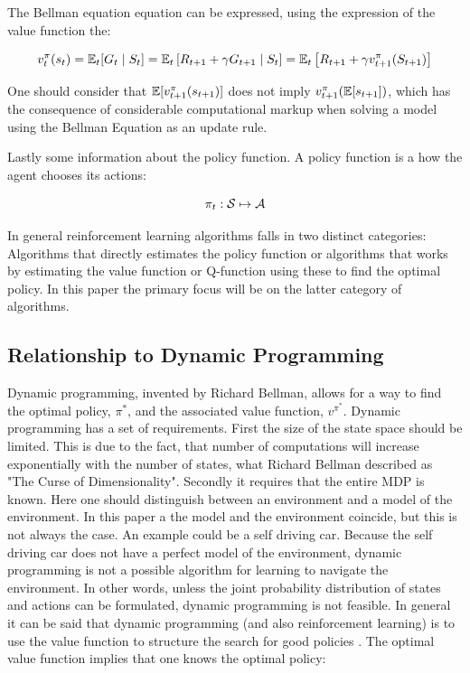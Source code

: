 The Bellman equation equation can be expressed, using the expression of the value function the:

\begin{equation}
    v^{\pi}_{t} (s_t) = \mathbb{E}_t [G_t \mid S_t] = \mathbb{E}_t  \left[ R_{t+1} + \gamma G_{t+1} \mid S_t \right] = \mathbb{E}_t \left[ R_{t+1} + \gamma v_{t+1}^{\pi}(S_{t+1}) \right]
\end{equation}

One should consider that $\mathbb{E} [v_{t+1}^\pi(s_{t+1})]$ does not imply $v_{t+1}^{\pi}(\mathbb{E}[s_{t+1}])$, which has the consequence of considerable computational markup when solving a model using the Bellman Equation as an update rule.

Lastly some information about the policy function.  A policy function is a how the agent chooses its actions:

\begin{equation}
    \pi_t : \mathcal{S} \mapsto \mathcal{A} 
\end{equation}

In general reinforcement learning algorithms falls in two distinct categories: Algorithms that directly estimates the policy function or algorithms that works by estimating the value function or Q-function using these to find the optimal policy. In this paper the primary focus will be on the latter category of algorithms.

\subsection{Relationship to Dynamic Programming}\label{sec:dynamic_programming}

Dynamic programming, invented by Richard Bellman, allows for a way to find the optimal policy, $\pi^{*}$, and the associated value function, $v^{\pi^{*}}$. Dynamic programming has a set of requirements. First the size of the state space should be limited. This is due to the fact, that number of computations will increase exponentially with the number of states, what Richard Bellman described as "The Curse of Dimensionality". Secondly it requires that the entire MDP is known. Here one should distinguish between an environment and a model of the environment. In this paper a the model and the environment coincide, but this is not always the case. An example could be a self driving car. Because the self driving car does not have a perfect model of the environment, dynamic programming is not a possible algorithm for learning to navigate the environment. In other words, unless the joint probability distribution of states and actions can be formulated, dynamic programming is not feasible. In general it can be said that dynamic programming (and also reinforcement learning) is to use the value function to structure the search for good policies  \parencite{sutton_reinforcement_2018}.  The optimal value function  implies that one knows the optimal policy:

